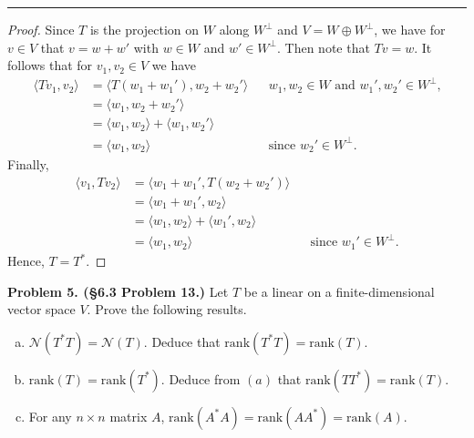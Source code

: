 \documentclass[leqno]{article}
\theoremstyle{nonumberplain}
\newtheorem{proof}{Proof}
\begin{document}
\noindent\rule[0.5ex]{\linewidth}{1pt}

\begin{proof}
Since $T$ is the projection on $W$ along $W^\perp$ and $V= W \oplus W^\perp$, we have for $v\in V$ that $v=w+w'$ with $w\in W$ and $w' \in W^\perp$. Then note that $Tv=w$. It follows that for $v_1, v_2 \in V$ we have
\begin{align*}
\langle Tv_1, v_2 \rangle &= \langle T (w_1 + w_1'), w_2+w_2' \rangle &&\textrm{$w_1, w_2 \in W$ and $w_1',w_2' \in W^\perp$,}\\
&= \langle w_1, w_2+w_2' \rangle \\
&= \langle w_1, w_2 \rangle + \langle w_1, w_2' \rangle \\
&= \langle w_1, w_2 \rangle && \textrm{since $w_2' \in W^\perp$.}  
\end{align*}
Finally,
\begin{align*}
\langle v_1, Tv_2 \rangle &= \langle w_1 + w_1',T( w_2+w_2') \rangle \\
&= \langle w_1+w_1', w_2 \rangle \\
&= \langle w_1, w_2 \rangle + \langle w_1', w_2 \rangle \\
&= \langle w_1, w_2 \rangle && \textrm{since $w_1' \in W^\perp$.}  
\end{align*}
Hence, $T=T^*$.
\end{proof}

\pagebreak





\noindent\textbf{Problem 5. (\S 6.3 Problem 13.)}  Let $T$ be a linear on a finite-dimensional vector space $V$. Prove the following results.
\begin{enumerate}[(a)]
\item $\mathcal{N}(T^* T)=\mathcal{N}(T).$ Deduce that $\mathrm{rank}(T^* T)=\mathrm{rank}(T)$.
\item $\mathrm{rank}(T)=\mathrm{rank}(T^*)$. Deduce from $(a)$ that $\mathrm{rank}(TT^*)=\mathrm{rank}(T)$.
\item For any $n\times n$ matrix $A$, $\mathrm{rank}(A^* A)=\mathrm{rank}(AA^*)=\mathrm{rank}(A)$.
\end{enumerate}
\end{document}
